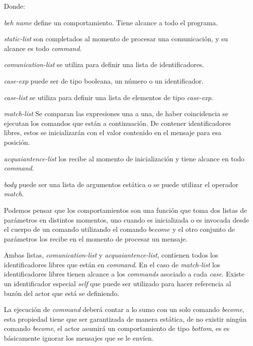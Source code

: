 Donde: 

\begin{description}
 \item \textit{beh name} define un comportamiento. Tiene alcance a todo el programa. 
 \item \textit{static-list} son completados al momento de procesar una comunicación, y su alcance es todo \textit{command}. 
 \item \textit{comunication-list} se utiliza para definir una lista de identificadores.
 \item \textit{case-exp} puede ser de tipo booleana, un número o un identificador. 
 \item \textit{case-list} se utiliza para definir una lista de elementos de tipo \textit{case-exp}.
 \item \textit{match-list} Se comparan las expresiones una a una, de haber coincidencia se ejecutan los comandos que están a continuación. De contener identificadores libres, estos se inicializarán con el valor contenido en el mensaje para esa posición.
 \item \textit{acquaiantence-list} los recibe al momento de inicialización y tiene alcance en todo \textit{command}.
 \item \textit{body} puede ser una lista de argumentos estática o se puede utilizar el operador \textit{match}.
\end{description}

Podemos pensar que los comportamientos son una función que toma dos listas de parámetros en distintos momentos, uno cuando es inicializada o es invocada desde el cuerpo de un comando utilizando el comando $become$ y el otro conjunto de parámetros los recibe en el momento de procesar un mensaje.

Ambas listas, \textit{comunication-list} y \textit{acquaiantence-list}, contienen todos los identificadores libres que están en \textit{command}. En el caso de \textit{match-list} los identificadores libres tienen alcance a los \textit{commands} asociado a cada \textit{case}. Existe un identificador especial \textit{self} que puede ser utilizado para hacer referencia al buzón del actor que está se definiendo. 

La ejecución de \textit{command} deberá contar a lo sumo con un solo comando \textit{become}, esta propiedad tiene que ser garantizada de manera estática, de no existir ningún comando \textit{become}, el actor asumirá un comportamiento de tipo \textit{bottom}, es es básicamente ignorar los mensajes que se le envíen.

